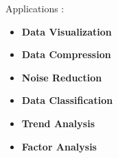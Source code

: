 \documentclass{beamer}
\begin{document}
\begin{frame}{Applications :}
\begin{itemize}
\item \textbf{Data Visualization}
\newline
\item \textbf{Data Compression}
\newline
\item \textbf{Noise Reduction}
\newline
\item \textbf{Data Classification}
\newline
\item \textbf{Trend Analysis}
\newline
\item \textbf{Factor Analysis}
\end{itemize}
    
\end{frame}
\end{document}
